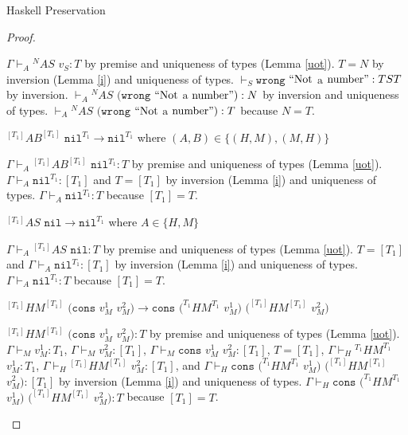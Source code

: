 \begin{theorem}{Haskell Preservation}
\begin{proof}
\begin{case}
$\Gamma\vdash_{A}{^{N}AS}$ $v_{S}:T$ by premise and uniqueness of types (Lemma \ref{uot}).  $T=N$ by inversion (Lemma \ref{i}) and uniqueness of types.  $\vdash_{S}\mathtt{wrong}$ $\mathrm{``Not}$ $\mathrm{a}$ $\mathrm{number"}:TST$ by inversion.  $\vdash_{A}{^{N}A}S$ $(\mathtt{wrong}$ $\mathrm{``Not}$ $\mathrm{a}$ $\mathrm{number"}):N$ by inversion and uniqueness of types.  $\vdash_{A}{^{N}A}S$ $(\mathtt{wrong}$ $\mathrm{``Not}$ $\mathrm{a}$ $\mathrm{number"}):T$ because $N=T$.
\end{case}


\begin{case}
$^{[T_{1}]}AB^{[T_{1}]}$ $\mathtt{nil}^{T_{1}}\rightarrow\mathtt{nil}^{T_{1}}$ where $(A,B)\in\lbrace(H,M),(M,H)\rbrace$

$\Gamma\vdash_{A}{^{[T_{1}]}A}B^{[T_{1}]}$ $\mathtt{nil}^{T_{1}}:T$ by premise and uniqueness of types (Lemma \ref{uot}).  $\Gamma\vdash_{A}\mathtt{nil}^{T_{1}}:[T_{1}]$ and $T=[T_{1}]$ by inversion (Lemma \ref{i}) and uniqueness of types.  $\Gamma\vdash_{A}\mathtt{nil}^{T_{1}}:T$ because $[T_{1}]=T$.
\end{case}


\begin{case}
$^{[T_{1}]}AS$ $\mathtt{nil}\rightarrow\mathtt{nil}^{T_{1}}$ where $A\in\lbrace H,M\rbrace$

$\Gamma\vdash_{A}{^{[T_{1}]}A}S$ $\mathtt{nil}:T$ by premise and uniqueness of types (Lemma \ref{uot}).  $T=[T_{1}]$ and $\Gamma\vdash_{A}\mathtt{nil}^{T_{1}}:[T_{1}]$ by inversion (Lemma \ref{i}) and uniqueness of types.  $\Gamma\vdash_{A}\mathtt{nil}^{T_{1}}:T$ because $[T_{1}]=T$.
\end{case}


\begin{case}
$^{[T_{1}]}HM^{[T_{1}]}$ $(\mathtt{cons}$ $v_{M}^{1}$ $v_{M}^{2})\rightarrow\mathtt{cons}$ $(^{T_{1}}HM^{T_{1}}$ $v_{M}^{1})$ $(^{[T_{1}]}HM^{[T_{1}]}$ $v_{M}^{2})$

$^{[T_{1}]}HM^{[T_{1}]}$ $(\mathtt{cons}$ $v_{M}^{1}$ $v_{M}^{2}):T$ by premise and uniqueness of types (Lemma \ref{uot}).  $\Gamma\vdash_{M}v_{M}^{1}:T_{1}$, $\Gamma\vdash_{M}v_{M}^{2}:[T_{1}]$, $\Gamma\vdash_{M}\mathtt{cons}$ $v_{M}^{1}$ $v_{M}^{2}:[T_{1}]$, $T=[T_{1}]$, $\Gamma\vdash_{H}{^{T_{1}}H}M^{T_{1}}$ $v_{M}^{1}:T_{1}$, $\Gamma\vdash_{H}{^{[T_{1}]}H}M^{[T_{1}]}$ $v_{M}^{2}:[T_{1}]$, and $\Gamma\vdash_{H}\mathtt{cons}$ $(^{T_{1}}HM^{T_{1}}$ $v_{M}^{1})$ $(^{[T_{1}]}HM^{[T_{1}]}$ $v_{M}^{2}):[T_{1}]$ by inversion (Lemma \ref{i}) and uniqueness of types.  $\Gamma\vdash_{H}\mathtt{cons}$ $(^{T_{1}}HM^{T_{1}}$ $v_{M}^{1})$ $(^{[T_{1}]}HM^{[T_{1}]}$ $v_{M}^{2}):T$ because $[T_{1}]=T$.
\end{case}


\end{proof}
\end{theorem}
